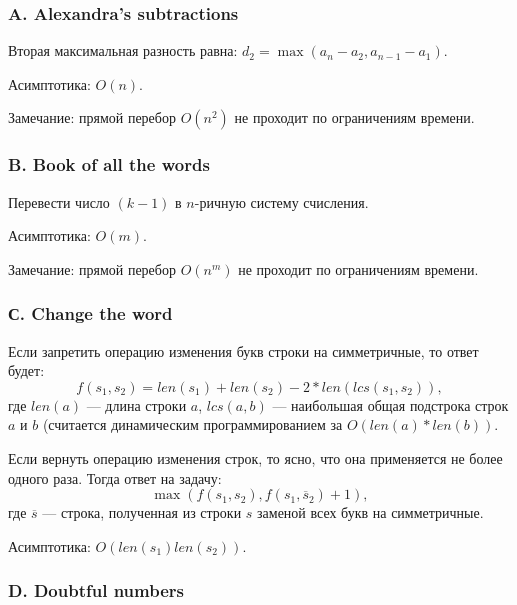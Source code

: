 \subsubsection*{A. Alexandra’s subtractions} 


Вторая максимальная разность равна: $d_2 = \max(a_n - a_2, a_{n-1} - a_1)$.

Асимптотика: $O(n)$.

Замечание: прямой перебор $O(n^2)$ не проходит по ограничениям времени.



\subsubsection*{B. Book of all the words} 


Перевести число $(k-1)$ в $n$-ричную систему счисления.

Асимптотика: $O(m)$.

Замечание: прямой перебор $O(n^m)$ не проходит по ограничениям времени.



\subsubsection*{С. Change the word} 


Если запретить операцию изменения букв строки на симметричные, то ответ будет:
$$f(s_1, s_2) = len(s_1) + len(s_2) - 2 * len(lcs(s_1, s_2)),$$
где $len(a)$ --- длина строки $a$, $lcs(a, b)$ --- наибольшая общая подстрока строк $a$ и $b$ (считается динамическим программированием за $O(len(a) * len(b))$. 

Если вернуть операцию изменения строк, то ясно, что она применяется не более одного раза. Тогда ответ на задачу:
$$ \max \left( f(s_1, s_2), f(s_1, \overline{s}_2) + 1 \right),$$
где $\overline{s}$ --- строка, полученная из строки $s$ заменой всех букв на симметричные.

Асимптотика: $O(len(s_1)  len(s_2) )$.



\subsubsection*{D. Doubtful numbers} 

